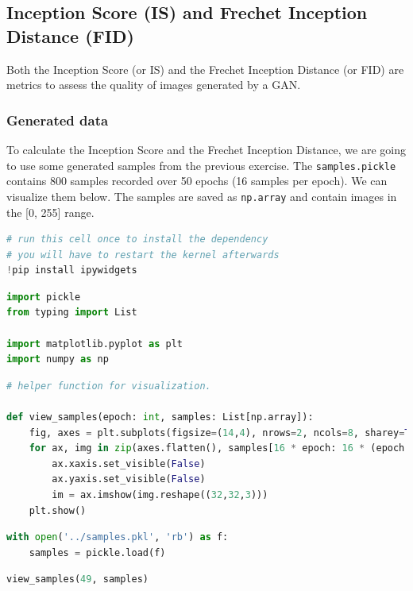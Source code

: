 \subsection{Inception Score (IS) and Frechet Inception Distance
(FID)}

Both the Inception Score (or IS) and the Frechet Inception Distance (or
FID) are metrics to assess the quality of images generated by a GAN.

\subsubsection{Generated data}

To calculate the Inception Score and the Frechet Inception Distance, we
are going to use some generated samples from the previous exercise. The
\lstinline{samples.pickle} contains 800 samples recorded
over 50 epochs (16 samples per epoch). We can visualize them below. The
samples are saved as \lstinline{np.array} and contain
images in the {[}0, 255{]} range.

\begin{lstlisting}[language=Python]
# run this cell once to install the dependency
# you will have to restart the kernel afterwards
!pip install ipywidgets
\end{lstlisting}

\begin{lstlisting}[language=Python]
import pickle
from typing import List

import matplotlib.pyplot as plt
import numpy as np
\end{lstlisting}

\begin{lstlisting}[language=Python]
# helper function for visualization.

def view_samples(epoch: int, samples: List[np.array]):
    fig, axes = plt.subplots(figsize=(14,4), nrows=2, ncols=8, sharey=True, sharex=True)
    for ax, img in zip(axes.flatten(), samples[16 * epoch: 16 * (epoch + 1)]):
        ax.xaxis.set_visible(False)
        ax.yaxis.set_visible(False)
        im = ax.imshow(img.reshape((32,32,3)))
    plt.show()
\end{lstlisting}

\begin{lstlisting}[language=Python]
with open('../samples.pkl', 'rb') as f:
    samples = pickle.load(f)
\end{lstlisting}

\begin{lstlisting}[language=Python]
view_samples(49, samples)
\end{lstlisting}

